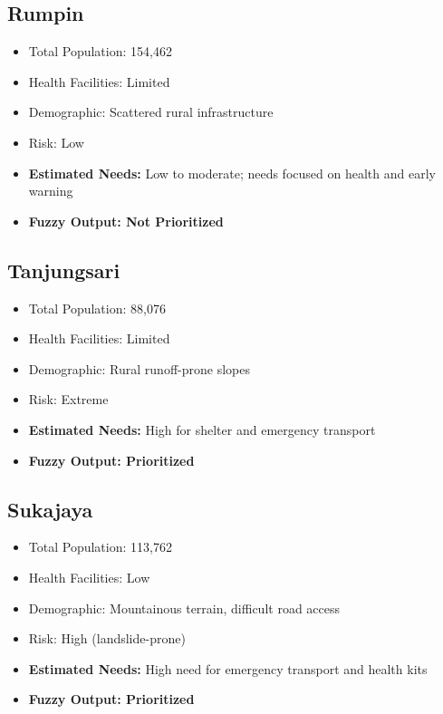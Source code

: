 \documentclass[journal,final,a4paper,twoside,11pt]{IEEEtran}
\begin{document}
\subsection*{Rumpin}
\begin{itemize}
    \item Total Population: 154,462
    \item Health Facilities: Limited
    \item Demographic: Scattered rural infrastructure
    \item Risk: Low
    \item \textbf{Estimated Needs:} Low to moderate; needs focused on health and early warning
    \item \textbf{Fuzzy Output: Not Prioritized}
\end{itemize}

\subsection*{Tanjungsari}
\begin{itemize}
    \item Total Population: 88,076
    \item Health Facilities: Limited
    \item Demographic: Rural runoff-prone slopes
    \item Risk: Extreme
    \item \textbf{Estimated Needs:} High for shelter and emergency transport
    \item \textbf{Fuzzy Output: Prioritized}
\end{itemize}

\subsection*{Sukajaya}
\begin{itemize}
    \item Total Population: 113,762
    \item Health Facilities: Low
    \item Demographic: Mountainous terrain, difficult road access
    \item Risk: High (landslide-prone)
    \item \textbf{Estimated Needs:} High need for emergency transport and health kits
    \item \textbf{Fuzzy Output: Prioritized}
\end{itemize}
\end{document}
